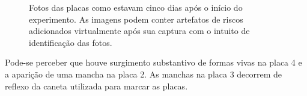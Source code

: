 \documentclass[12pt, titlepage]{article}
\begin{document}
\begin{figure}[H]
	\centering
	\ContinuedFloat
	\caption{Fotos das placas como estavam cinco dias após o início do experimento. As imagens podem conter artefatos de riscos adicionados virtualmente após sua captura com o intuito de identificação das fotos.}
	\label{obs1}
\end{figure}

Pode-se perceber que houve surgimento substantivo de formas vivas na placa 4 e a aparição de uma mancha na placa 2.
As manchas na placa 3 decorrem de reflexo da caneta utilizada para marcar as placas.
\end{document}
